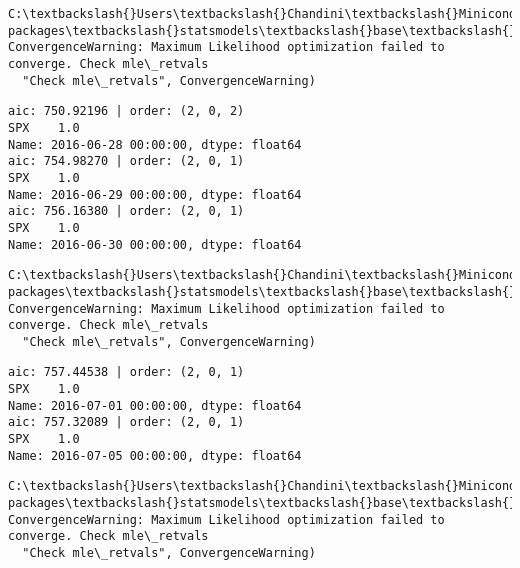 \documentclass[11pt]{article}
\begin{document}
    \begin{Verbatim}[commandchars=\\\{\}]
C:\textbackslash{}Users\textbackslash{}Chandini\textbackslash{}Miniconda3\textbackslash{}envs\textbackslash{}auquan\textbackslash{}lib\textbackslash{}site-packages\textbackslash{}statsmodels\textbackslash{}base\textbackslash{}model.py:496: ConvergenceWarning: Maximum Likelihood optimization failed to converge. Check mle\_retvals
  "Check mle\_retvals", ConvergenceWarning)

    \end{Verbatim}

    \begin{Verbatim}[commandchars=\\\{\}]
aic: 750.92196 | order: (2, 0, 2)
SPX    1.0
Name: 2016-06-28 00:00:00, dtype: float64
aic: 754.98270 | order: (2, 0, 1)
SPX    1.0
Name: 2016-06-29 00:00:00, dtype: float64
aic: 756.16380 | order: (2, 0, 1)
SPX    1.0
Name: 2016-06-30 00:00:00, dtype: float64

    \end{Verbatim}

    \begin{Verbatim}[commandchars=\\\{\}]
C:\textbackslash{}Users\textbackslash{}Chandini\textbackslash{}Miniconda3\textbackslash{}envs\textbackslash{}auquan\textbackslash{}lib\textbackslash{}site-packages\textbackslash{}statsmodels\textbackslash{}base\textbackslash{}model.py:496: ConvergenceWarning: Maximum Likelihood optimization failed to converge. Check mle\_retvals
  "Check mle\_retvals", ConvergenceWarning)

    \end{Verbatim}

    \begin{Verbatim}[commandchars=\\\{\}]
aic: 757.44538 | order: (2, 0, 1)
SPX    1.0
Name: 2016-07-01 00:00:00, dtype: float64
aic: 757.32089 | order: (2, 0, 1)
SPX    1.0
Name: 2016-07-05 00:00:00, dtype: float64

    \end{Verbatim}

    \begin{Verbatim}[commandchars=\\\{\}]
C:\textbackslash{}Users\textbackslash{}Chandini\textbackslash{}Miniconda3\textbackslash{}envs\textbackslash{}auquan\textbackslash{}lib\textbackslash{}site-packages\textbackslash{}statsmodels\textbackslash{}base\textbackslash{}model.py:496: ConvergenceWarning: Maximum Likelihood optimization failed to converge. Check mle\_retvals
  "Check mle\_retvals", ConvergenceWarning)

    \end{Verbatim}
\end{document}
